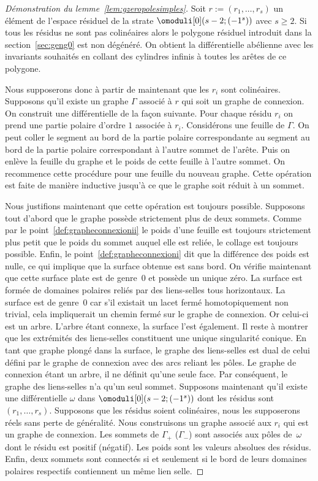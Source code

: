 \begin{proof}[Démonstration du lemme~\ref{lem:gzeropolesimples}]
Soit $r:=(r_{1},\dots,r_{s})$ un élément de l'espace résiduel de la strate $\omoduli[0](s-2;(-1^{s}))$ avec $s\geq2$. Si tous les résidus ne sont pas colinéaires alors le polygone résiduel introduit dans la section~\ref{sec:geng0} est non dégénéré. On obtient la différentielle abélienne avec les invariants souhaités en collant des cylindres infinis à toutes les arêtes de ce polygone.

Nous supposerons donc à partir de maintenant que les $r_{i}$ sont colinéaires. Supposons qu'il existe un graphe $\Gamma$ associé à $r$ qui soit un graphe de connexion. On construit une différentielle de la façon suivante. Pour chaque résidu $r_{i}$ on prend une partie polaire d'ordre $1$ associée à $r_{i}$. Considérons une feuille de $\Gamma$. On peut coller le segment au bord de la partie polaire correspondante au segment au bord de la partie polaire correspondant à l'autre sommet de l'arête. Puis on enlève la feuille du graphe et le poids de cette feuille à l'autre sommet. On recommence cette procédure pour une feuille du nouveau graphe. Cette opération est faite de manière inductive jusqu'à ce que le graphe soit réduit à un sommet.

Nous justifions maintenant que cette opération est toujours possible. Supposons tout d'abord que le graphe possède strictement plus de deux sommets. Comme par le point~\eqref{def:grapheconnexionii} le poids d'une feuille est toujours strictement plus petit que le poids du sommet auquel elle est reliée, le collage est toujours possible. Enfin, le point~\eqref{def:grapheconnexioni} dit que la différence des poids est nulle, ce qui implique que la surface obtenue est sans bord. On vérifie maintenant que cette surface plate est de genre~$0$ et possède un unique zéro. La surface est formée de domaines polaires reliés par des liens-selles tous horizontaux. La surface est de genre~$0$ car s'il existait un lacet fermé homotopiquement non trivial, cela impliquerait un chemin fermé sur le graphe de connexion. Or celui-ci est un arbre. L'arbre étant connexe, la surface l'est également. Il reste à montrer que les extrémités des liens-selles constituent une unique singularité conique. En tant que graphe plongé dans la surface, le graphe des liens-selles est dual de celui défini par le graphe de connexion avec des arcs reliant les pôles. Le graphe de connexion étant un arbre, il ne définit qu'une seule face. Par conséquent, le graphe des liens-selles n'a qu'un seul sommet.
Supposons maintenant qu'il existe une différentielle $\omega$ dans $\omoduli[0](s-2;(-1^{s}))$ dont les résidus sont $(r_{1},\dots,r_{s})$. Supposons que les résidus soient colinéaires, nous les supposerons réels sans perte de généralité. Nous construisons un graphe associé aux $r_{i}$ qui est un graphe de connexion. Les sommets de $\Gamma_{+}$ (\resp $\Gamma_{-}$) sont associés aux pôles de~$\omega$ dont le résidu est positif (\resp négatif). Les poids sont les valeurs absolues des résidus. Enfin, deux sommets sont connectés si et seulement si le bord de leurs domaines polaires respectifs contiennent un même lien selle.


\end{proof}
